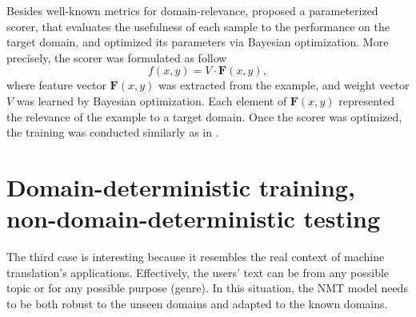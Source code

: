 Besides well-known metrics for domain-relevance, \citet{Zhang19curriculum} proposed a parameterized scorer, that evaluates the usefulness of each sample to the performance on the target domain, and optimized its parameters via Bayesian optimization. More precisely, the scorer was formulated as follow
\begin{equation}
\mathit{f}(x,y) = V \cdot \mathbf{F}(x,y),
\end{equation}
where feature vector $\mathbf{F}(x,y)$ was extracted from the example, and weight vector $V$ was learned by Bayesian optimization. Each element of $\mathbf{F}(x,y)$ represented the relevance of the example to a target domain. Once the scorer was optimized, the training was conducted similarly as in \citet{Wees17dynamic,Wang19dynamically}.

\section{Domain-deterministic training, non-domain-deterministic testing}
\label{sec:case3}
The third case is interesting because it resembles the real context of machine translation's applications. Effectively, the users' text can be from any possible topic or for any possible purpose (genre). In this situation, the NMT model needs to be both robust to the unseen domains and adapted to the known domains. 
